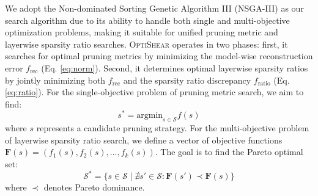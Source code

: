 We adopt the Non-dominated Sorting Genetic Algorithm III (NSGA-III) \cite{deb2013evolutionary} as our search algorithm due to its ability to handle both single and multi-objective optimization problems, making it suitable for unified pruning metric and layerwise sparsity ratio searches.
\textsc{OptiShear} operates in two phases: first, it searches for optimal pruning metrics by minimizing the model-wise reconstruction error $f_{\text{rec}}$ (Eq. \ref{eq:norm}). Second, it determines optimal layerwise sparsity ratios by jointly minimizing both $f_{\text{rec}}$ and the sparsity ratio discrepancy $f_{\text{ratio}}$ (Eq. \ref{eq:ratio}).
For the single-objective problem of pruning metric search, we aim to find:
\begin{equation}
    s^* = \text{argmin}_{s \in \mathcal{S}} f(s)
\end{equation}
where $s$ represents a candidate pruning strategy. 
For the multi-objective problem of layerwise sparsity ratio search, we define a vector of objective functions $\mathbf{F}(s) = (f_1(s), f_2(s), ..., f_k(s))$. The goal is to find the Pareto optimal set:
\begin{equation}
    \mathcal{S}^* = \{s \in \mathcal{S} \mid \nexists s' \in \mathcal{S} : \mathbf{F}(s') \prec \mathbf{F}(s)\}
\end{equation}
where $\prec$ denotes Pareto dominance. 

